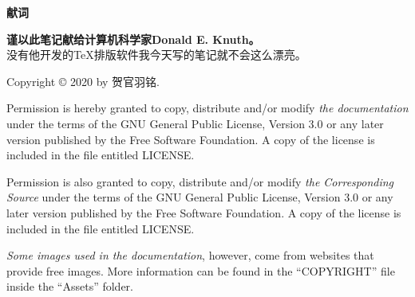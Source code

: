 \begin{center}
\begin{LARGE}
\textbf{献词}
\end{LARGE}

\medskip
{\large \textbf{\textcolor{green!60!black}
{谨以此笔记献给计算机科学家Donald E. Knuth。}}}
\\没有他开发的\TeX 排版软件我今天写的笔记就不会这么漂亮。
\end{center}

\vfill
Copyright \copyright{} 2020 by 贺官羽铭.

Permission is hereby granted to copy, distribute and/or modify 
\emph{the documentation} under the terms of the \textsc{GNU} General Public License, 
Version 3.0 or any later version published by the Free Software Foundation.
A copy of the license is included in the file entitled LICENSE.

Permission is also granted to copy, distribute and/or modify 
\emph{the Corresponding Source} under the terms of the \textsc{GNU} General Public 
License, Version 3.0 or any later version published by the Free Software Foundation.
A copy of the license is included in the file entitled LICENSE.

\emph{Some images used in the documentation}, however, come from websites that 
provide free images. More information can be found in the ``COPYRIGHT'' file inside 
the ``Assets'' folder.